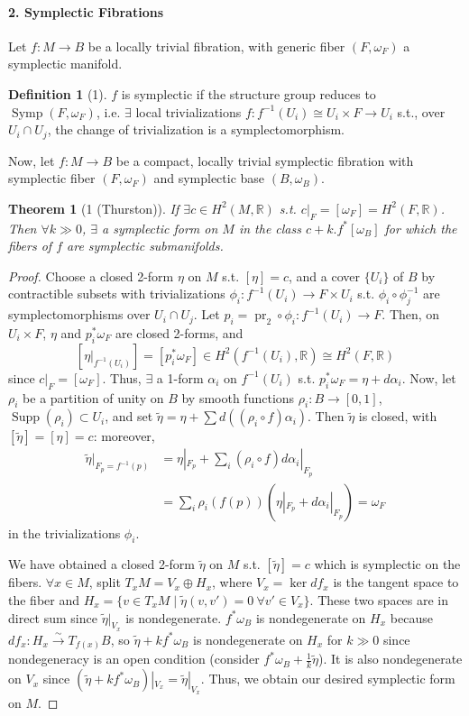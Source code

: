 \documentclass[UTF8,11pt]{ctexart}
\newtheorem*{theorem}{Theorem}
\theoremstyle{definition}
\newtheorem*{definition}{Definition}
\newcommand{\R}{\mathbb R}
\begin{document}
\paragraph{2. Symplectic Fibrations}
Let $f:M\to B$ be a locally trivial fibration, with generic fiber $(F,\omega_F)$ a symplectic manifold.
\begin{definition}[1]
$f$ is symplectic if the structure group reduces to $\operatorname{Symp}(F,\omega_F)$, i.e. $\exists$ local trivializations $f:f^{-1}(U_i)\cong U_i\times F\to U_i$ s.t., over $U_i\cap U_j$, the change of trivialization is a symplectomorphism.
\end{definition}
Now, let $f:M\to B$ be a compact, locally trivial symplectic fibration with symplectic fiber $(F,\omega_F)$ and symplectic base $(B,\omega_B)$.
\begin{theorem}[1 (Thurston)]
If $\exists c\in H^2(M,\R)$ s.t. $c|_F=[\omega_F]=H^2(F,\R)$. Then $\forall k\gg0$, $\exists$ a symplectic form on $M$ in the class $c+k.f^*[\omega_B]$ for which the fibers of $f$ are symplectic submanifolds.
\end{theorem}
\begin{proof}
Choose a closed 2-form $\eta$ on $M$ s.t. $[\eta]=c$, and a cover $\{U_i\}$ of $B$ by contractible subsets with trivializations $\phi_i:f^{-1}(U_i)\to F\times U_i$ s.t. $\phi_i\circ\phi_j^{-1}$ are symplectomorphisms over $U_i\cap U_j$. Let $p_i=\operatorname{pr}_2\circ\phi_i:f^{-1}(U_i)\to F$. Then, on $U_i\times F$, $\eta$ and $p_i^*\omega_F$ are closed 2-forms, and
\[
[\eta|_{f^{-1}(U_i)}]=[p_i^*\omega_F]\in H^2(f^{-1}(U_i),\R)\cong H^2(F,\R) \tag{3}
\]
since $c|_F=[\omega_F]$. Thus, $\exists$ a 1-form $\alpha_i$ on $f^{-1}(U_i)$ s.t. $p_i^*\omega_F=\eta+d\alpha_i$. Now, let $\rho_i$ be a partition of unity on $B$ by smooth functions $\rho_i:B\to[0,1]$, $\operatorname{Supp}(\rho_i)\subset U_i$, and set $\widetilde\eta=\eta+\sum d((\rho_i\circ f)\alpha_i)$. Then $\widetilde\eta$ is closed, with $[\widetilde\eta]=[\eta]=c$: moreover,
\begin{align*}
\widetilde\eta|_{F_p=f^{-1}(p)}
&=\eta|_{F_p}+\sum_i(\rho_i\circ f)d\alpha_i|_{F_p}\\
&=\sum_i\rho_i(f(p))(\eta|_{F_p}+d\alpha_i|_{F_p})=\omega_F \tag{4}
\end{align*}
in the trivializations $\phi_i$.

We have obtained a closed 2-form $\widetilde\eta$ on $M$ s.t. $[\widetilde\eta]=c$ which is symplectic on the fibers. $\forall x\in M$, split $T_xM=V_x\oplus H_x$, where $V_x=\ker df_x$ is the tangent space to the fiber and $H_x=\{v\in T_xM\mid\widetilde\eta(v,v')=0\ \forall v'\in V_x\}$. These two spaces are in direct sum since $\widetilde\eta|_{V_x}$ is nondegenerate. $f^*\omega_B$ is nondegenerate on $H_x$ because $df_x:H_x\xrightarrow{\sim}T_{f(x)}B$, so $\widetilde\eta+kf^*\omega_B$ is nondegenerate on $H_x$ for $k\gg0$ since nondegeneracy is an open condition (consider $f^*\omega_B+\frac1k\widetilde\eta$). It is also nondegenerate on $V_x$ since $(\widetilde\eta+kf^*\omega_B)|_{V_x}=\widetilde\eta|_{V_x}$. Thus, we obtain our desired symplectic form on $M$.
\end{proof}
\end{document}

